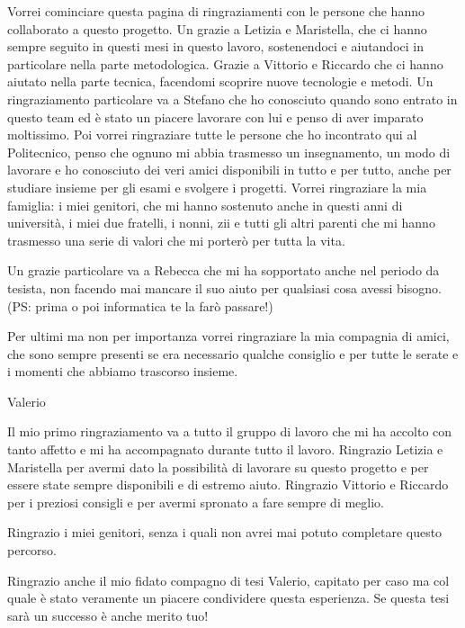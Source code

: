 Vorrei cominciare questa pagina di ringraziamenti con le persone che hanno collaborato a questo progetto.
Un grazie a Letizia e Maristella, che ci hanno sempre seguito in questi mesi in questo lavoro, sostenendoci e aiutandoci in particolare nella parte metodologica. Grazie a Vittorio e Riccardo che ci hanno aiutato nella parte tecnica, facendomi scoprire nuove tecnologie e metodi.
Un ringraziamento particolare va a Stefano che ho conosciuto quando sono entrato in questo team ed è stato un piacere lavorare con lui e penso di aver imparato moltissimo. 
Poi vorrei ringraziare tutte le persone che ho incontrato qui al Politecnico, penso che ognuno mi abbia trasmesso un insegnamento, un modo di lavorare e ho conosciuto dei veri amici disponibili in tutto e per tutto, anche per studiare insieme per gli esami e svolgere i progetti.
Vorrei ringraziare la mia famiglia: i miei genitori, che mi hanno sostenuto anche in questi anni di università, i miei due fratelli, i nonni, zii e tutti gli altri parenti che mi hanno trasmesso una serie di valori che mi porterò per tutta la vita. 

Un grazie particolare va a Rebecca che mi ha sopportato anche nel periodo da tesista, non facendo mai mancare il suo aiuto per qualsiasi cosa avessi bisogno. (PS: prima o poi informatica te la farò passare!)

Per ultimi ma non per importanza vorrei ringraziare la mia compagnia di amici, che sono sempre presenti se era necessario qualche consiglio e per tutte le serate e i momenti che abbiamo trascorso insieme.

\vspace{1cm}

\begin{flushright}
	Valerio
\end{flushright}


\cleardoublepage

Il mio primo ringraziamento va a tutto il gruppo di lavoro che mi ha accolto con tanto affetto e mi ha accompagnato durante tutto il lavoro. Ringrazio Letizia e Maristella per avermi dato la possibilità di lavorare su questo progetto e per essere state sempre disponibili e di estremo aiuto. Ringrazio Vittorio e Riccardo per i preziosi consigli e per avermi spronato a fare sempre di meglio. 

Ringrazio i miei genitori, senza i quali non avrei mai potuto completare questo percorso.

Ringrazio anche il mio fidato compagno di tesi Valerio, capitato per caso ma col quale è stato veramente un piacere condividere questa esperienza. Se questa tesi sarà un successo è anche merito tuo!

